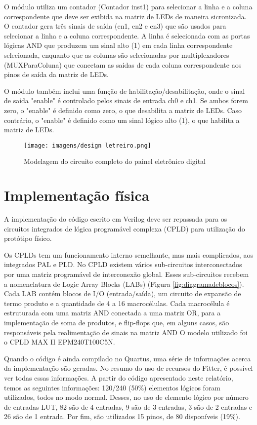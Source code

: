 O módulo utiliza um contador (Contador inst1) para selecionar a linha e a coluna correspondente que deve ser exibida na matriz de LEDs de maneira sicronizada. O contador gera três sinais de saída (en1, en2 e en3) que são usados para selecionar a linha e a coluna correspondente. A linha é selecionada com as portas lógicas AND que produzem um sinal alto (1) em cada linha correspondente selecionada, enquanto que as colunas são selecionadas por multiplexadores (MUXParaColuna) que conectam as saídas de cada coluna correspondente aos pinos de saída da matriz de LEDs.

O módulo também inclui uma função de habilitação/desabilitação, onde o sinal de saída "enable" é controlado pelos sinais de entrada ch0 e ch1. Se ambos forem zero, o "enable" é definido como zero, o que desabilita a matriz de LEDs. Caso contrário, o "enable" é definido como um sinal lógico alto (1), o que habilita a matriz de LEDs.

\begin{figure}
    \centering
    \texttt{[image: imagens/design letreiro.png]}
    \caption{Modelagem do circuito completo do painel eletrônico digital}
    \label{fig:modelagem}
\end{figure}

\section{Implementação física}

A implementação do código escrito em Verilog deve ser repassada para os circuitos integrados de lógica programável complexa (CPLD) para utilização do protótipo físico. 

Os CPLDs tem um funcionamento interno semelhante, mas mais complicados, aos integrados PAL e PLD. No CPLD existem vários sub-circuitos interconectados por uma matriz programável de interconexão global. Esses sub-circuitos recebem a nomenclatura de Logic Array Blocks (LABs) (Figura \ref{fig:diagramadeblocos}). Cada LAB contém blocos de I/O (entrada/saída), um circuito de expansão de termo produto e a quantidade de 4 a 16 macrocélulas. Cada macrocélula é estruturada com uma matriz AND conectada a uma matriz OR, para a implementação de soma de produtos, e flip-flops que, em alguns casos, são responsáveis pela realimentação de sinais na matriz AND \cite{CLPDarquitetura} O modelo utilizado foi o CPLD MAX II EPM240T100C5N.

Quando o código é ainda compilado no Quartus, uma série de informações acerca da implementação são geradas. No resumo do uso de recursos do Fitter, é possível ver todas essas informações. A partir do código apresentado neste relatório, temos as seguintes informações: 120/240 (50\%) elementos lógicos foram utilizados, todos no modo normal. Desses, no uso de elemento lógico por número de entradas LUT, 82 são de 4 entradas, 9 são de 3 entradas, 3 são de 2 entradas e 26 são de 1 entrada. Por fim, são utilizados 15 pinos, de 80 disponíveis (19\%).

